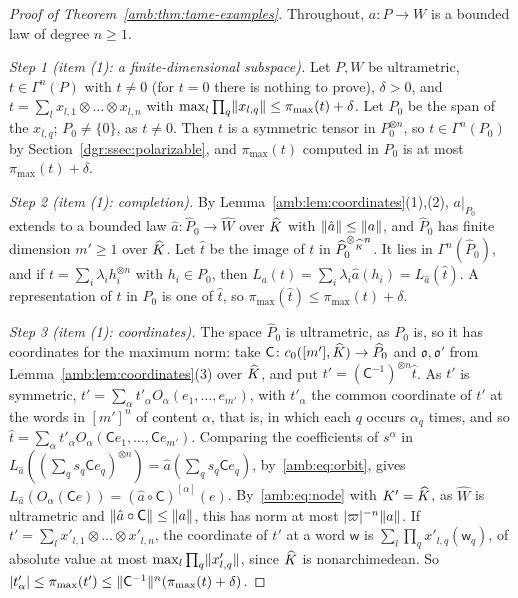 \begin{proof}[Proof of Theorem~\ref{amb:thm:tame-examples}]
Throughout, $a\colon P\to W$ is a bounded law of degree $n\ge1$.

\emph{Step 1 (item (1): a finite-dimensional subspace).} Let $P,W$ be ultrametric, $t\in\Gamma^n(P)$ with $t\ne0$ (for $t=0$ there is nothing to prove), $\delta>0$, and
$t=\sum_lx_{l,1}\otimes\dots\otimes x_{l,n}$ with $\max_l\prod_q\lVert x_{l,q}\rVert\le\pi_{\max}(t)+\delta$. Let $P_0$ be the span
of the $x_{l,q}$; $P_0\ne\{0\}$, as $t\ne0$. Then $t$ is a symmetric tensor in $P_0^{\otimes n}$, so $t\in\Gamma^n(P_0)$ by
Section~\ref{dgr:ssec:polarizable}, and $\pi_{\max}(t)$ computed in $P_0$ is at most $\pi_{\max}(t)+\delta$.

\emph{Step 2 (item (1): completion).} By Lemma~\ref{amb:lem:coordinates}(1),(2), $a|_{P_0}$ extends to a bounded law
$\hat a\colon\widehat P_0\to\widehat W$ over $\widehat K$ with $\lVert \hat a\rVert\le\lVert a\rVert$, and $\widehat P_0$ has finite dimension
$m'\ge1$ over $\widehat K$. Let $\hat t$ be the image of $t$ in $\widehat P_0^{\otimes_{\widehat K}n}$. It lies in $\Gamma^n(\widehat P_0)$,
and if $t=\sum_i\lambda_ih_i^{\otimes n}$ with $h_i\in P_0$, then $L_a(t)=\sum_i\lambda_i\hat a(h_i)=L_{\hat a}(\hat t)$. A
representation of $t$ in $P_0$ is one of $\hat t$, so $\pi_{\max}(\hat t)\le\pi_{\max}(t)+\delta$.

\emph{Step 3 (item (1): coordinates).} The space $\widehat P_0$ is ultrametric, as $P_0$ is, so it has coordinates for the maximum norm: take $\mathsf C\colon
c_0([m'],\widehat K)\to\widehat P_0$ and $\mathfrak o,\mathfrak o'$ from Lemma~\ref{amb:lem:coordinates}(3) over $\widehat K$, and put
$t'=(\mathsf C^{-1})^{\otimes n}\hat t$. As $t'$ is symmetric, $t'=\sum_\alpha t'_\alpha O_\alpha(e_1,\dots,e_{m'})$, with
$t'_\alpha$ the common coordinate of $t'$ at the words in $[m']^n$ of content $\alpha$, that is, in which each $q$ occurs $\alpha_q$ times, and so
$\hat t=\sum_\alpha t'_\alpha O_\alpha(\mathsf Ce_1,\dots,\mathsf Ce_{m'})$. Comparing the coefficients of $s^\alpha$ in
$L_{\hat a}((\sum_qs_q\mathsf Ce_q)^{\otimes n})=\hat a(\sum_qs_q\mathsf Ce_q)$, by~\eqref{amb:eq:orbit}, gives
$L_{\hat a}(O_\alpha(\mathsf Ce))=(\hat a\circ\mathsf C)^{[\alpha]}(e)$. By~\eqref{amb:eq:node} with $K'=\widehat K$, as $\widehat W$ is ultrametric and
$\lVert \hat a\circ\mathsf C\rVert\le\lVert a\rVert$, this has norm at most $\lvert \varpi\rvert^{-n}\lVert a\rVert$. If
$t'=\sum_lx'_{l,1}\otimes\dots\otimes x'_{l,n}$, the coordinate of $t'$ at a word $\mathsf w$ is
$\sum_l\prod_qx'_{l,q}(\mathsf w_q)$, of absolute value at most $\max_l\prod_q\lVert x'_{l,q}\rVert$, since $\widehat K$ is
nonarchimedean. So $\lvert t'_\alpha\rvert\le\pi_{\max}(t')\le\lVert \mathsf C^{-1}\rVert^n(\pi_{\max}(t)+\delta)$.


\end{proof}
